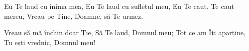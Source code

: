 \beginverse
Eu Te laud cu inima mea,
Eu Te laud cu sufletul meu,
Eu Te caut, Te caut mereu,
Vreau pe Tine, Doamne, să Te urmez.
\endverse

\beginchorus
Vreau să mă închin doar Ție,
Să Te laud, Domnul meu;
Tot ce am Îți aparține,
Tu ești vrednic, Domnul meu!
\endchorus
\endsong